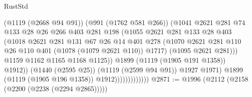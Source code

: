 \begin{lexlean}{RustStd}
\begin{coremodule}
{\begin{coremodule}
{{{{{{{                                      (@1119 (@2668 @94 @91))
                                      (@991 (@1762 @581 @266))
                                      (@1041
                                        @2621
                                        @281
                                        @74
                                        @133
                                        @28
                                        @26
                                        @266
                                        @403
                                        @281
                                        @198
                                        (@1055
                                          @2621
                                          @281
                                          @133
                                          @28
                                          @403
                                          (@1018
                                            @2621
                                            @281
                                            @131
                                            @67
                                            @26
                                            @14
                                            @401
                                            @278
                                            (@1070
                                              @2621
                                              @281
                                              @110
                                              @26
                                              @110
                                              @401
                                              (@1078 (@1079 @2621 @110))
                                              @1717)
                                            (@1095 @2621 @281)))
                                        @1159
                                        @1162
                                        @1165
                                        @1168
                                        @1125))
                                    @1899
                                    (@1119 (@1905 @191 @1358))
                                    @1912))
                                (@1440 (@2595 @25))
                                (@1119 (@2599 @94 @91))
                                @1927
                                @1971)
                              @1899
                              (@1119 (@1905 @196 @1358))
                              @1912)))))))))))))
@2871 := @1996 (@2112 (@2158 (@2200 (@2238 (@2294 @2865)))))
}}}}}}}
\end{coremodule}}
\end{coremodule}
\end{lexlean}
